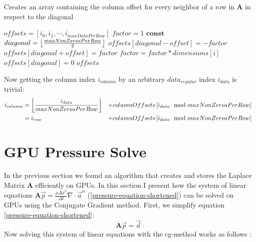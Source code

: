 \begin{algorithm}
\caption{Creates an array containing the column offset for every neighbor of a row in \textbf{A} in respect to the diagonal}\label{diagonalOffsets}
\begin{algorithmic}[1]
	\State $offsets = \left[ i_0, i_1, \cdots, i_{maxDataPerRow} \right]$  
	\State $factor = 1$
	\State $\mathbf{const}$ $diagonal = \floor*{\frac{maxNonZerosPerRow}{2}}$
	\State 
    	\State $offsets[diagonal - offset] = -factor$
        \State $offsets[diagonal + offset] = factor$
        \State $factor = factor * dimensions[i]$
	\EndFor
	\State $offsets[diagonal] = 0$
	\State \Return $offsets$
	
\EndFunction
\end{algorithmic}
\end{algorithm}
Now getting the column index $i_{column}$ by an arbitrary $data_{regular}$ index $i_{data}$ is trivial:
\begin{equation}
\begin{aligned}
	i_{column} & = \floor*{\frac{i_{data}}{maxNonZerosPerRow}} & + columnOffsets\left[ i_{data} \mod maxNonZerosPerRow \right]\\
			   & = i_{row} & + columnOffsets\left[ i_{data} \mod maxNonZerosPerRow \right]\\
\end{aligned}
\end{equation}

\section{GPU Pressure Solve}
In the previous section we found an algorithm that creates and stores the Laplace Matrix \textbf{A} efficiently on GPUs. In this section I present how the system of linear equations $\mathbf{A}\vec{p} = \frac{\rho \Delta x^2}{\Delta t}\nabla \cdot \vec{u}^n$ (\ref{pressure-equation-shortened}) can be solved on GPUs using the Conjugate Gradient method. First, we simplify equation \ref{pressure-equation-shortened}:
\begin{equation}
	\mathbf{A}\vec{p} = \vec{d} 
\end{equation}
Now solving this system of linear equations with the cg-method works as follows \parencite{hestenes1952methods}:

